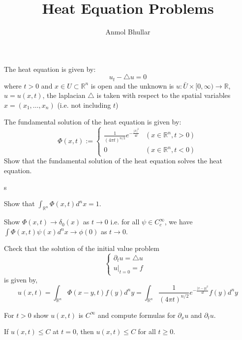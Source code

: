 \documentclass[12pt]{article}
\newenvironment{solution}[2][Solution]{\begin{trivlist}
\item[\hskip \labelsep {\bfseries #1}]}{\end{trivlist}}
\newenvironment{problem}[2][Problem]{\begin{trivlist}
\item[\hskip \labelsep {\bfseries #1}\hskip \labelsep {\bfseries #2.}]}{\end{trivlist}}
\begin{document}
 
 
\title{Heat Equation Problems}
\author{Anmol Bhullar}
 
\maketitle

The heat equation is given by:
\[ u_t - \bigtriangleup u = 0 \]
where $t>0$ and $x\in U\subset\mathbb{R}^n$ is open and the unknown is $u: \bar{U}\times [0,\infty) \to \mathbb{R}$, $u = u(x,t)$, the
laplacian $\bigtriangleup$ is taken with respect to the spatial variables $x = (x_1,\hdots,x_n)$ (i.e. not including $t$)

\begin{problem}{1}
	The fundamental solution of the heat equation is given by:
	\[ \Phi(x,t) := \begin{cases} \frac{1}{(4\pi t)^{n/2}} e^{-\frac{|x|^2}{4t}} & (x\in\mathbb{R}^n, t > 0) \\ 0 & (x\in\mathbb{R}^n, t < 0) \end{cases} \]
	Show that the fundamental solution of the heat equation solves the heat equation.
\end{problem}


\begin{solution}{}
	s
\end{solution}

\begin{problem}{2}
	Show that $\int_{\mathbb{R}^n} \Phi(x,t)d^nx = 1$.
\end{problem}

\begin{solution}
	s
\end{solution}

\begin{problem}{3}
	Show $\Phi(x,t) \to \delta_0(x)$ as $t \to 0$ i.e. for all $\psi \in C_c^{\infty}$, we have $\int \Phi(x,t)\psi(x)d^nx \to \phi(0)$ as $t\to 0$.
\end{problem}

\begin{problem}{4}
	Check that the solution of the initial value problem
	\[ \begin{cases} 
      		\partial_t u = \bigtriangleup u &\\
      		u|_{t=0} = f &
	\end{cases} \]
	is given by,
	\[ u(x,t) = \int_{\mathbb{R}^n} \Phi(x-y,t)f(y)d^n y = \int_{\mathbb{R}^n} \frac{1}{(4\pi t)^{n/2}}e^{-\frac{|x-y|^2}{4t}}f(y) d^ny \]
\end{problem}

\begin{problem}{5}
	For $t>0$ show $u(x,t)$ is $C^{\infty}$ and compute formulas for $\partial_x u$ and $\partial_t u$.
\end{problem}

\begin{problem}{6}[The Maximum Principle]
	If $u(x,t)\leq C$ at $t=0$, then $u(x,t)\leq C$ for all $t\geq 0$.
\end{problem}
\end{document}
